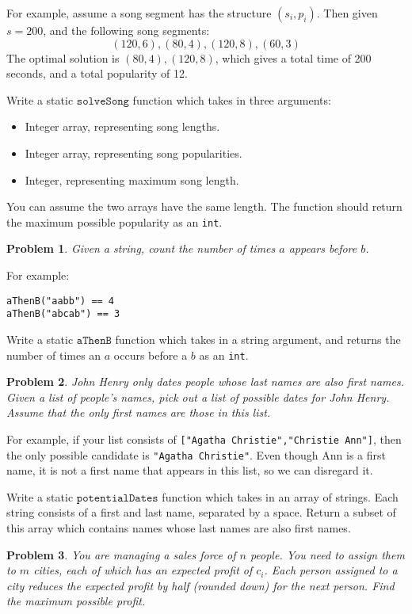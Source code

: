 \documentclass{article}
\newtheorem{problem}{Problem}
\begin{document}
For example, assume a song segment has the structure $(s_i, p_i)$.  Then given $s=200$, and the following song segments:
\[
(120,6),(80,4),(120,8),(60,3)
\]
The optimal solution is $(80,4),(120,8)$, which gives a total time of 200 seconds, and a total popularity of 12.

Write a static $\texttt{solveSong}$ function which takes in three arguments:
\begin{itemize}
\item Integer array, representing song lengths.
\item Integer array, representing song popularities.
\item Integer, representing maximum song length.
\end{itemize} 
You can assume the two arrays have the same length.  The function should return the maximum possible popularity as an \texttt{int}.

\begin{problem}
Given a string, count the number of times $a$ appears before $b$.
\end{problem}
For example:
\begin{center}
\texttt{aThenB("aabb") == 4} \\
\texttt{aThenB("abcab") == 3}
\end{center}

Write a static $\texttt{aThenB}$ function which takes in a string argument, and returns the number of times an $a$ occurs before a $b$ as an \texttt{int}.

\begin{problem}
John Henry only dates people whose last names are also first names.  Given a list of people's names, pick out a list of possible dates for John Henry.  Assume that the only first names are those in this list.
\end{problem}

For example, if your list consists of \texttt{["Agatha Christie","Christie Ann"]}, then the only possible candidate is \texttt{"Agatha Christie"}.  Even though Ann is a first name, it is not a first name that appears in this list, so we can disregard it.

Write a static $\texttt{potentialDates}$ function which takes in an array of strings.  Each string consists of a first and last name, separated by a space.  Return a subset of this array which contains names whose last names are also first names.

\begin{problem}
You are managing a sales force of $n$ people.  You need to assign them to $m$ cities, each of which has an expected profit of $c_i$.  Each person assigned to a city reduces the expected profit by half (rounded down) for the next person.  Find the maximum possible profit.
\end{problem}
\end{document}
